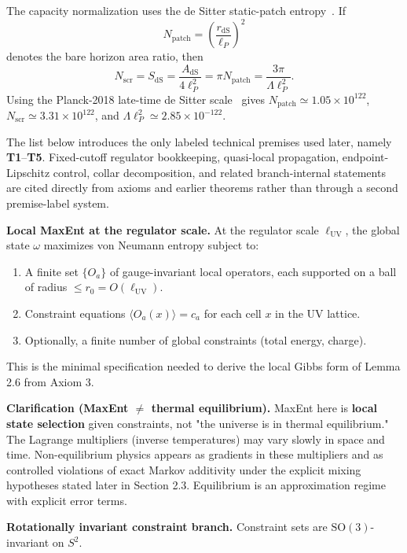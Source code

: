 The capacity normalization uses the de Sitter static-patch entropy~\cite{gibbonsHawking77}. If
\[
N_{\mathrm{patch}}=\left(\frac{r_{\mathrm{dS}}}{\ell_P}\right)^2
\]
denotes the bare horizon area ratio, then
\[
N_{\mathrm{scr}}=S_{\mathrm{dS}}=\frac{A_{\mathrm{dS}}}{4\ell_P^2}
=\pi N_{\mathrm{patch}}
=\frac{3\pi}{\Lambda\ell_P^2}.
\]
Using the Planck-2018 late-time de Sitter scale~\cite{planck18} gives
\(N_{\mathrm{patch}}\simeq1.05\times10^{122}\),
\(N_{\mathrm{scr}}\simeq3.31\times10^{122}\), and
\(\Lambda\ell_P^2\simeq2.85\times10^{-122}\).

The list below introduces the only labeled technical premises used later, namely \textbf{T1}--\textbf{T5}. Fixed-cutoff regulator bookkeeping, quasi-local propagation, endpoint-Lipschitz control, collar decomposition, and related branch-internal statements are cited directly from axioms and earlier theorems rather than through a second premise-label system.

\textbf{Local MaxEnt at the regulator scale.} At the regulator scale \(\ell_{\mathrm{UV}}\), the global state \(\omega\) maximizes von Neumann entropy subject to:

\begin{enumerate}
\def\labelenumi{\arabic{enumi}.}
\tightlist
\item
  A finite set \(\{O_a\}\) of gauge-invariant local operators, each supported on a ball of radius \(\le r_0 = O(\ell_{\mathrm{UV}})\).
\item
  Constraint equations \(\langle O_a(x) \rangle = c_a\) for each cell \(x\) in the UV lattice.
\item
  Optionally, a finite number of global constraints (total energy, charge).
\end{enumerate}

This is the minimal specification needed to derive the local Gibbs form of Lemma 2.6 from Axiom 3.

\textbf{Clarification (MaxEnt \(\neq\) thermal equilibrium).} MaxEnt here is \textbf{local state selection} given constraints, not "the universe is in thermal equilibrium." The Lagrange multipliers (inverse temperatures) may vary slowly in space and time. Non-equilibrium physics appears as gradients in these multipliers and as controlled violations of exact Markov additivity under the explicit mixing hypotheses stated later in Section 2.3. Equilibrium is an approximation regime with explicit error terms.

\textbf{Rotationally invariant constraint branch.} Constraint sets are \(\mathrm{SO}(3)\)-invariant on \(S^2\).

